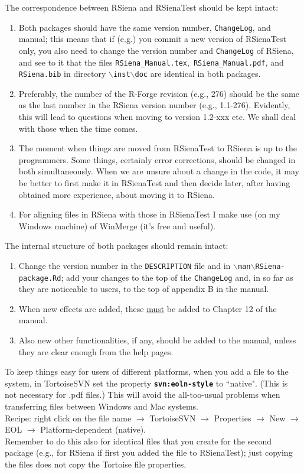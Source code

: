 \documentclass[12pt, a4paper]{article}
\renewcommand{\=}{\,=\,}
\newcommand{\+}{\,+\,}
\newcommand{\sfn}[1]{\textbf{\texttt{#1}}}
\newcommand{\bs}{\backslash}
\newcommand{\rs}{{\sf RSiena}}
\newcommand{\RS}{{\sf RSiena }}
\newcommand{\rst}{{\sf RSienaTest}}
\newcommand{\RST}{{\sf RSienaTest }}
\begin{document}
The correspondence between \RS and \RST should be kept intact:
\begin{enumerate}
\item Both packages should have the same version number, \texttt{ChangeLog}, and
     manual; this means that if (e.g.) you commit a new version of \RST only,
     you also need to change the version number and \texttt{ChangeLog} of \rs,
     and see to it that the files \texttt{RSiena\_Manual.tex},\ \texttt{RSiena\_Manual.pdf},
     and \texttt{RSiena.bib} in directory \texttt{$\bs$inst$\bs$doc} are identical
     in both packages.
\item Preferably, the number of the R-Forge revision (e.g., 276) should
     be the same as the last number in the \RS version number (e.g., 1.1-276).
     Evidently, this will lead to questions when moving to version 1.2-xxx etc.
     We shall deal with those when the time comes.
\item The moment when things are moved from \RST to \RS is up to the programmers.
     Some things, certainly error corrections, should be changed in both simultaneously.
     When we are unsure about a change in the code, it may be better to first
     make it in \RST and then decide later, after having obtained more experience,
     about moving it to \rs.
\item For aligning files in \RS with those in \RST I make use (on my Windows machine)
     of WinMerge (it's free and useful).
\end{enumerate}

The internal structure of both packages should remain intact:
\begin{enumerate}
\item Change the version number in the \texttt{DESCRIPTION} file and in
      \texttt{$\bs$man$\bs$RSiena-package.Rd};
      add your changes to the top of the \texttt{ChangeLog} and,
      in so far as they are noticeable
      to users, to the top of appendix B in the manual.
\item When new effects are added, these \underline{must} be added to
      Chapter 12 of the manual.
\item Also new other functionalities, if any, should be added to the manual,
      unless they are clear enough from the help pages.
\end{enumerate}

To keep things easy for users of different platforms, when you add a file to the system,
in TortoiseSVN set the property \sfn{svn:eoln-style} to ``native".
(This is not necessary for .pdf files.)
This will avoid the all-too-usual problems when transferring files between Windows and Mac systems.\\
Recipe: right click on the file name $\rightarrow$ TortoiseSVN $\rightarrow$ Properties  $\rightarrow$
New  $\rightarrow$ EOL  $\rightarrow$ Platform-dependent (native).\\
Remember to do this also for identical files that you create for the second package (e.g., for \RS if
first you added the file to \rst); just copying the files does not copy
the Tortoise file properties.
\end{document}
